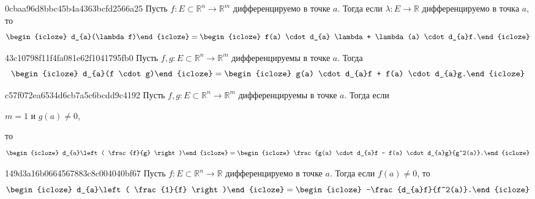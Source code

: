 \begin{note}{0cbaa96d8bbc45b4a4363bcfd2566a25}
    Пусть \({ f : E \subset \mathbb R^{n} \to \mathbb R^{m} }\) дифференцируемо в точке \({ a }\).
    Тогда если \({ \lambda : E \to \mathbb R }\) дифференцируемо в точка \({ a }\), то
    \[
        \begin{icloze}{2}d_{a}(\lambda f)\end{icloze} = \begin{icloze}{1}f(a) \cdot d_{a} \lambda + \lambda(a) \cdot d_{a}f.\end{icloze}
    \]
\end{note}

\begin{note}{43c10798f11f4fa081e62f1041795fb0}
    Пусть \({ f, g : E \subset \mathbb R^{n} \to \mathbb R^{m} }\) дифференцируемы в точке \({ a }\).
    Тогда
    \[
        \begin{icloze}{2}d_{a}(f \cdot g)\end{icloze} = \begin{icloze}{1}g(a) \cdot d_{a}f + f(a) \cdot d_{a}g.\end{icloze}
    \]
\end{note}

\begin{note}{c57f072ea6534d6cb7a5c6bcdd9c4192}
    Пусть \({ f, g : E \subset \mathbb R^{n} \to \mathbb R^{m} }\) дифференцируемы в точке \({ a }\).
    Тогда если \begin{icloze}{3}\({ m = 1 }\) и \({ g(a) \neq 0 }\),\end{icloze} то
    \[
        \begin{icloze}{2}d_{a}\left( \frac{f}{g} \right)\end{icloze} = \begin{icloze}{1}\frac{g(a) \cdot d_{a}f - f(a) \cdot d_{a}g}{g^2(a)}.\end{icloze}
    \]
\end{note}

\begin{note}{149d3a16b0664567883c8c004040bf67}
    Пусть \({ f : E \subset \mathbb R^{n} \to \mathbb R }\) дифференцируемо в точке \({ a }\).
    Тогда если \({ f(a) \neq 0 }\), то
    \[
        \begin{icloze}{2}d_{a}\left( \frac{1}{f} \right)\end{icloze} = \begin{icloze}{1}-\frac{d_{a}f}{f^2(a)}.\end{icloze}
    \]
\end{note}

